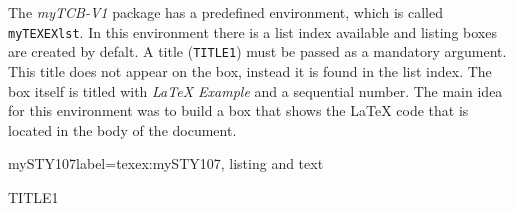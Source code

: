\documentclass[]{myHOWTO-V001}
\begin{document}
The \emph{myTCB-V1} package has a predefined environment, which is called \Verb|myTEXEXlst|. In this environment there is a list index available and listing boxes are created by defalt. A title (\verb|TITLE1|) must be passed as a mandatory argument. This title does not appear on the box, instead it is found in the list index. The box itself is titled with \emph{\LaTeX{} Example} and a sequential number. The main idea for this environment was to build a box that shows the \LaTeX{} code that is located in the body of the document.

\begin{myTEXEXdoclst}{mySTY107}{label={texex:mySTY107}, listing and text}
\begin{myTEXEXlst}{TITLE1}{}
\end{myTEXEXlst}
\end{myTEXEXdoclst}
\end{document}

